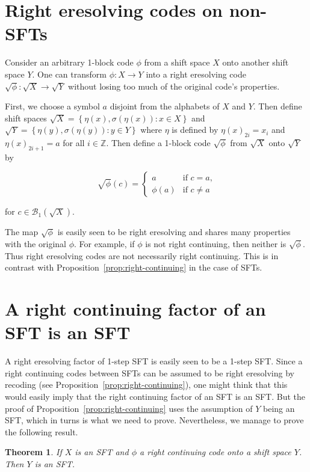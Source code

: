 \documentclass[a4paper]{amsart}
\newtheorem{thm}{Theorem}[section]
\theoremstyle{definition}
\numberwithin{equation}{section}
\numberwithin{figure}{section}
\theoremstyle{definition}
\theoremstyle{remark}
\begin{document}
\section{Right eresolving codes on non-SFTs}

Consider an arbitrary 1-block code $\phi$ from a shift space $X$ onto another shift space $Y$. One can transform $\phi: X \to Y$ into a right eresolving code $\sqrt \phi : \sqrt X \to \sqrt Y$ without losing too much of the original code's properties.

First, we choose a symbol $a$  disjoint from the alphabets of $X$ and $Y$. Then define shift spaces $\sqrt X = {\left\{ {\eta(x), \sigma(\eta(x)) : x \in X } \right\}} $ and  $\sqrt Y = {\left\{ {\eta(y), \sigma(\eta(y)) : y \in Y } \right\}} $ where $\eta$ is defined by $ \eta(x)_{2i} = x_i$ and $\eta(x)_{2i+1} = a $ for all $i \in {\mathbb{Z}}$. 
Then define a 1-block code $\sqrt \phi$ from $\sqrt X$ onto $\sqrt Y$ by 

\[ \sqrt\phi(c) = 
\begin{cases}
  a & \text{if $c=a$,} \\
  \phi(a) & \text{if $c\neq a$}
\end{cases}
\]

for $c \in {\mathcal B}_1(\sqrt X)$.

The map $\sqrt \phi$ is easily seen to be right eresolving and shares many properties with the original $\phi$. For example, if $\phi$ is not right continuing, then neither is $\sqrt \phi$. Thus right eresolving codes are not necessarily right continuing. This is in contrast with Proposition~\ref{prop:right-continuing} in the case of SFTs.

\section{A right continuing factor of an SFT is an SFT}

A right eresolving factor of 1-step SFT is easily seen to be a 1-step SFT. Since a right continuing codes between SFTs can be assumed to be right eresolving by recoding (see Proposition~\ref{prop:right-continuing}), one might think that this would easily imply that the right continuing factor of an SFT is an SFT. But the proof of Proposition~\ref{prop:right-continuing} uses the assumption of $Y$ being an SFT, which in turns is what we need to prove. Nevertheless, we manage to prove the following result.

\begin{thm}\label{thm:rc-sft-sft}
 If $X$ is an SFT and $\phi$ a right continuing code onto a shift space $Y$. Then $Y$ is an SFT.
\end{thm}
\end{document}

